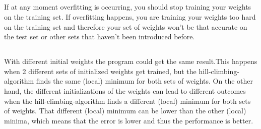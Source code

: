 \documentclass{scrartcl}
\begin{document}
  \subsection{}
 If at any moment overfitting is occurring, you should stop training your weights on the training set. If overfitting happens, you are training your weights too hard on the training set and therefore your set of weights won't be that accurate on the test set or other sets that haven't been introduced before.
  
  \subsection{}
  With different initial weights the program could get the same result.This happens when 2 different sets of initialized weights get trained, but the hill-climbing-algorithm finds the same (local) minimum for both sets of weights. On the other hand, the different initializations of the weights
 can lead to different outcomes when the hill-climbing-algorithm finds a different (local) minimum for both sets of weights. That different (local) minimum can be lower than the other (local) minima, which means that the error is lower and thus the performance is better.
  
\end{document}
